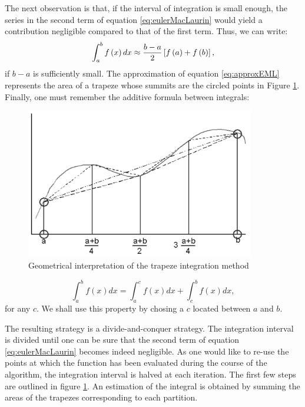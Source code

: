 \documentclass[twoside]{book}
\begin{document}
The next observation is that, if the interval of integration is
small enough, the series in the second term of equation
\ref{eq:eulerMacLaurin} would yield a contribution negligible
compared to that of the first term. Thus, we can write:
\begin{equation}
\label{eq:approxEML}
  \int_a^b f\left(x\right)dx\approx{b-a\over
  2}\left[f\left(a\right)+f\left(b\right)\right],
\end{equation}
if $b-a$ is sufficiently small. The approximation of equation
\ref{eq:approxEML} represents the area of a trapeze whose summits
are the circled points in Figure \ref{fig:trapeze}. Finally, one
must remember the additive formula between integrals:
\begin{figure}
\centering\includegraphics[width=10cm]{Figures/IntegrationGraph}
\caption{Geometrical interpretation of the trapeze integration
method}\label{fig:trapeze}
\end{figure}
\begin{equation}
\label{eq:addintegral}
  \int_a^b f\left(x\right)dx=\int_a^c f\left(x\right)dx+\int_c^b f\left(x\right)dx,
\end{equation}
for any $c$. We shall use this property by chosing a $c$ located
between $a$ and $b$.

The resulting strategy is a divide-and-conquer strategy. The
integration interval is divided until one can be sure that the
second term of equation \ref{eq:eulerMacLaurin} becomes indeed
negligible. As one would like to re-use the points at which the
function has been evaluated during the course of the algorithm,
the integration interval is halved at each iteration. The first
few steps are outlined in figure \ref{fig:trapeze}. An estimation
of the integral is obtained by summing the areas of the trapezes
corresponding to each partition.
\end{document}
